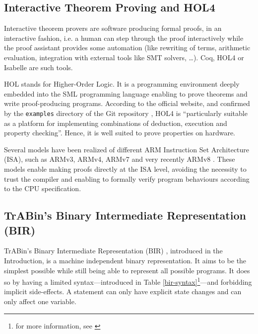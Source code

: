 \documentclass{kththesis}
\begin{document}
\subsection{Interactive Theorem Proving and HOL4}

Interactive theorem provers are software producing formal proofs, in an
interactive fashion, i.e. a human can step through the proof interactively while the proof assistant provides some automation (like rewriting of terms, arithmetic evaluation, integration with external tools like SMT solvers, \dots). Coq, HOL4 or Isabelle are such tools.

HOL \cite{noauthor_hol_nodate} stands for Higher-Order Logic. It is a programming environment deeply embedded into the SML programming language enabling to prove theorems and write proof-producing programs. According to the official website, and confirmed by the \texttt{examples} directory of the Git repository \cite{noauthor_canonical_2019}, HOL4 is ``particularly suitable as a platform for implementing combinations of deduction, execution and property checking''. Hence, it is well suited to prove properties on hardware.

Several models have been realized of different ARM Instruction Set Architecture (ISA), such as ARMv3, ARMv4, ARMv7 \cite{noauthor_canonical_2019, hutchison_trustworthy_2010} and very recently ARMv8 \cite{armstrong_isa_2019}. These models enable making proofs directly at the ISA level, avoiding the necessity to trust the compiler and enabling to formally verify program behaviours according to the CPU specification.

\subsection{TrABin's Binary Intermediate Representation (BIR)}

TrABin's Binary Intermediate Representation (BIR) \cite{lindner_trabin:_2019}, introduced in the Introduction, is a machine independent binary representation. It aims to be the simplest possible while still being able to represent all possible programs. It does so by having a limited syntax---introduced in Table \ref{bir-syntax}\footnote{for more information, see \cite{lindner_trabin:_2019}}---and forbidding implicit side-effects. A statement can only have explicit state changes and can only affect one variable.
\end{document}
